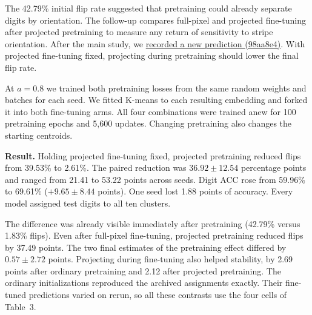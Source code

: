 The 42.79\% initial flip rate suggested that pretraining could already separate digits by orientation. The follow-up compares full-pixel and projected fine-tuning after projected pretraining to measure any return of sensitivity to stripe orientation. After the main study, we \href{https://github.com/JohnR31N/cs126FinalProj/blob/98aa8e4/IDEC/stage/design.md}{recorded a new prediction (98aa8e4)}. With projected fine-tuning fixed, projecting during pretraining should lower the final flip rate.

At $a=0.8$ we trained both pretraining losses from the same random weights and batches for each seed. We fitted K-means to each resulting embedding and forked it into both fine-tuning arms. All four combinations were trained anew for 100 pretraining epochs and 5,600 updates. Changing pretraining also changes the starting centroids.

\begin{center}\small

\end{center}

\textbf{Result.} Holding projected fine-tuning fixed, projected pretraining reduced flips from 39.53\% to 2.61\%. The paired reduction was $36.92\pm12.54$ percentage points and ranged from 21.41 to 53.22 points across seeds. Digit ACC rose from 59.96\% to 69.61\% ($+9.65\pm8.44$ points). One seed lost 1.88 points of accuracy. Every model assigned test digits to all ten clusters.

The difference was already visible immediately after pretraining (42.79\% versus 1.83\% flips). Even after full-pixel fine-tuning, projected pretraining reduced flips by 37.49 points. The two final estimates of the pretraining effect differed by $0.57\pm2.72$ points. Projecting during fine-tuning also helped stability, by 2.69 points after ordinary pretraining and 2.12 after projected pretraining. The ordinary initializations reproduced the archived assignments exactly. Their fine-tuned predictions varied on rerun, so all these contrasts use the four cells of Table~3.
